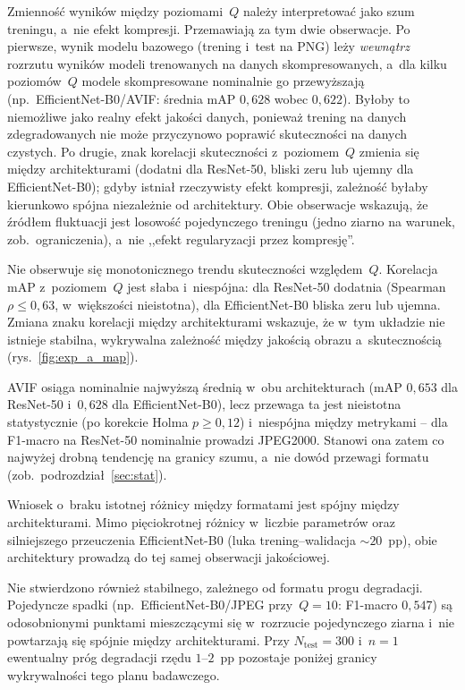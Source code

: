 \documentclass[12pt,a4paper]{article}
\begin{document}
Zmienność wyników między poziomami~$Q$ należy interpretować jako szum treningu, a~nie efekt kompresji. Przemawiają za tym dwie obserwacje. Po pierwsze, wynik modelu bazowego (trening i~test na PNG) leży \emph{wewnątrz} rozrzutu wyników modeli trenowanych na danych skompresowanych, a~dla kilku poziomów~$Q$ modele skompresowane nominalnie go przewyższają (np.~EfficientNet-B0/AVIF: średnia mAP $0{,}628$ wobec $0{,}622$). Byłoby to niemożliwe jako realny efekt jakości danych, ponieważ trening na danych zdegradowanych nie może przyczynowo poprawić skuteczności na danych czystych. Po drugie, znak korelacji skuteczności z~poziomem~$Q$ zmienia się między architekturami (dodatni dla ResNet-50, bliski zeru lub ujemny dla EfficientNet-B0); gdyby istniał rzeczywisty efekt kompresji, zależność byłaby kierunkowo spójna niezależnie od architektury. Obie obserwacje wskazują, że źródłem fluktuacji jest losowość pojedynczego treningu (jedno ziarno na warunek, zob.~ograniczenia), a~nie ,,efekt regularyzacji przez kompresję''.

Nie obserwuje się monotonicznego trendu skuteczności względem~$Q$. Korelacja mAP z~poziomem~$Q$ jest słaba i~niespójna: dla ResNet-50 dodatnia (Spearman $\rho \le 0{,}63$, w~większości nieistotna), dla EfficientNet-B0 bliska zeru lub ujemna. Zmiana znaku korelacji między architekturami wskazuje, że w~tym układzie nie istnieje stabilna, wykrywalna zależność między jakością obrazu a~skutecznością (rys.~\ref{fig:exp_a_map}).

AVIF osiąga nominalnie najwyższą średnią w~obu architekturach (mAP $0{,}653$ dla ResNet-50 i~$0{,}628$ dla EfficientNet-B0), lecz przewaga ta jest nieistotna statystycznie (po korekcie Holma $p \ge 0{,}12$) i~niespójna między metrykami -- dla F1-macro na ResNet-50 nominalnie prowadzi JPEG2000. Stanowi ona zatem co najwyżej drobną tendencję na granicy szumu, a~nie dowód przewagi formatu (zob.~podrozdział~\ref{sec:stat}).

Wniosek o~braku istotnej różnicy między formatami jest spójny między architekturami. Mimo pięciokrotnej różnicy w~liczbie parametrów oraz silniejszego przeuczenia EfficientNet-B0 (luka trening--walidacja ${\sim}20$~pp), obie architektury prowadzą do tej samej obserwacji jakościowej.

Nie stwierdzono również stabilnego, zależnego od formatu progu degradacji. Pojedyncze spadki (np.~EfficientNet-B0/JPEG przy~$Q=10$: F1-macro $0{,}547$) są odosobnionymi punktami mieszczącymi się w~rozrzucie pojedynczego ziarna i~nie powtarzają się spójnie między architekturami. Przy $N_{\text{test}}=300$ i~$n=1$ ewentualny próg degradacji rzędu $1$--$2$~pp pozostaje poniżej granicy wykrywalności tego planu badawczego.
\end{document}
